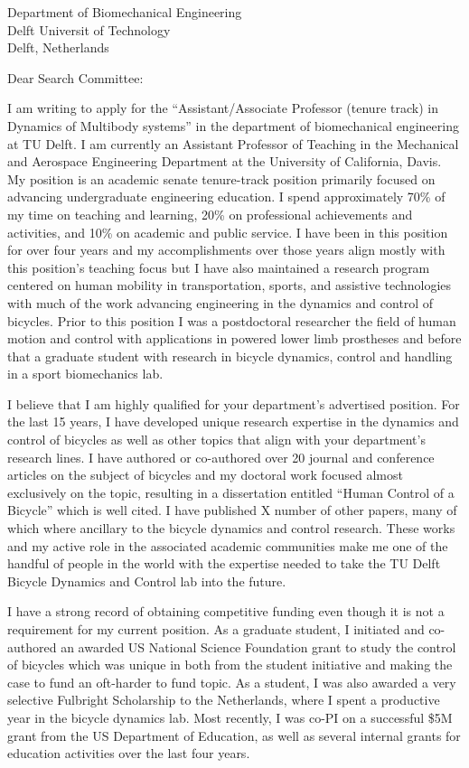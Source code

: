 \documentclass{letter}
\date{}
\begin{document}
\begin{letter}{
  Department of Biomechanical Engineering \\
  Delft Universit of Technology \\
  Delft, Netherlands
}

\opening{Dear Search Committee:}

I am writing to apply for the ``Assistant/Associate Professor (tenure track) in
Dynamics of Multibody systems'' in the department of biomechanical engineering
at TU Delft. I am currently an Assistant Professor of Teaching in the
Mechanical and Aerospace Engineering Department at the University of
California, Davis. My position is an academic senate tenure-track position
primarily focused on advancing undergraduate engineering education. I spend
approximately 70\% of my time on teaching and learning, 20\% on professional
achievements and activities, and 10\% on academic and public service. I have
been in this position for over four years and my accomplishments over those
years align mostly with this position's teaching focus but I have also
maintained a research program centered on human mobility in transportation,
sports, and assistive technologies with much of the work advancing engineering
in the dynamics and control of bicycles. Prior to this position I was a
postdoctoral researcher the field of human motion and control with applications
in powered lower limb prostheses and before that a graduate student with
research in bicycle dynamics, control and handling in a sport biomechanics lab.

I believe that I am highly qualified for your department's advertised position.
For the last 15 years, I have developed unique research expertise in the
dynamics and control of bicycles as well as other topics that align with your
department's research lines. I have authored or co-authored over 20 journal and
conference articles on the subject of bicycles and my doctoral work focused
almost exclusively on the topic, resulting in a dissertation entitled ``Human
Control of a Bicycle'' which is well cited. I have published X number of other
papers, many of which where ancillary to the bicycle dynamics and control
research. These works and my active role in the associated academic communities
make me one of the handful of people in the world with the expertise needed to
take the TU Delft Bicycle Dynamics and Control lab into the future.

I have a strong record of obtaining competitive funding even though it is not a
requirement for my current position. As a graduate student, I initiated and
co-authored an awarded US National Science Foundation grant to study the
control of bicycles which was unique in both from the student initiative and
making the case to fund an oft-harder to fund topic. As a student, I was also
awarded a very selective Fulbright Scholarship to the Netherlands, where I
spent a productive year in the bicycle dynamics lab. Most recently, I was co-PI
on a successful \$5M grant from the US Department of Education, as well as
several internal grants for education activities over the last four years.


\end{letter}
\end{document}
